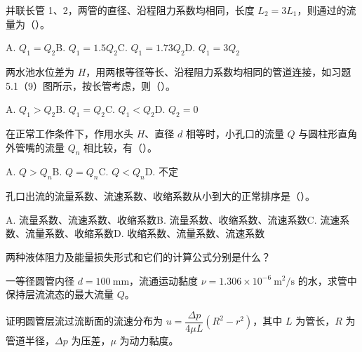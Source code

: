 \begin{ti}
\begin{choices}
\item 并联长管 1、2，两管的直径、沿程阻力系数均相同，长度 $L_2=3L_1$，则通过的流量为（\hspace{1cm}）。
\item[] A. $Q_1=Q_2$\quad B. $Q_1=1.5Q_2$\quad C. $Q_1=1.73Q_2$\quad D. $Q_1=3Q_2$
\item 两水池水位差为 $H$，用两根等径等长、沿程阻力系数均相同的管道连接，如习题 5.1（9）图所示，按长管考虑，则（\hspace{1cm}）。
\item[] A. $Q_1>Q_2$\quad B. $Q_1=Q_2$\quad C. $Q_1<Q_2$\quad D. $Q_2=0$
\item 在正常工作条件下，作用水头 $H$、直径 $d$ 相等时，小孔口的流量 $Q$ 与圆柱形直角外管嘴的流量 $Q_n$ 相比较，有（\hspace{1cm}）。
\item[] A. $Q>Q_n$\quad B. $Q=Q_n$\quad C. $Q<Q_n$\quad D. 不定
\item 孔口出流的流量系数、流速系数、收缩系数从小到大的正常排序是（\hspace{1cm}）。
\item[] A. 流量系数、流速系数、收缩系数\quad B. 流量系数、收缩系数、流速系数\quad C. 流速系数、流量系数、收缩系数\quad D. 收缩系数、流量系数、流速系数
\end{choices}

\item 两种液体阻力及能量损失形式和它们的计算公式分别是什么？

\item 一等径圆管内径 $d=100\ \mathrm{mm}$，流通运动黏度 $\nu=1.306\times10^{-6}\ \mathrm{m^2/s}$ 的水，求管中保持层流流态的最大流量 $Q$。

\item 证明圆管层流过流断面的流速分布为 $u=\dfrac{\Delta p}{4\mu L}\left(R^2-r^2\right)$，其中 $L$ 为管长，$R$ 为管道半径，$\Delta p$ 为压差，$\mu$ 为动力黏度。


\end{ti}
